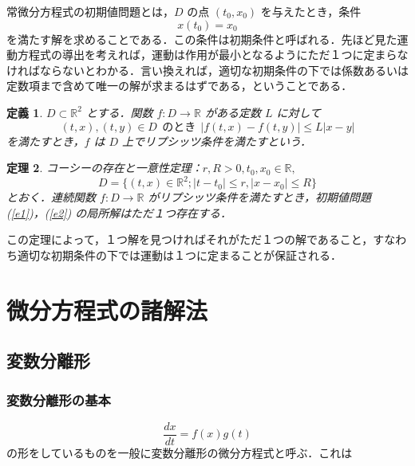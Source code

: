 \documentclass[dvipdfmx, a4paper]{jsarticle}
\newcommand{\R}{\mathbb{R}}
\newtheorem{theorem}{定理}
\newtheorem{definition}[theorem]{定義}
\begin{document}
常微分方程式の初期値問題とは，$D$ の点 $(t_0, x_0)$ を与えたとき，条件
\begin{equation}
    \label{e2}
    x(t_0)=x_0
\end{equation}
を満たす解を求めることである．この条件は初期条件と呼ばれる．先ほど見た運動方程式の導出を考えれば，運動は作用が最小となるようにただ１つに定まらなければならないとわかる．言い換えれば，適切な初期条件の下では係数あるいは定数項まで含めて唯一の解が求まるはずである，ということである．

\begin{definition}
    $D\subset\R^2$ とする．関数 $f: D\to\R$ がある定数 $L$ に対して
    \begin{equation}
        (t, x), (t, y)\in D\ \  のとき\ \ |f(t, x)-f(t, y)|\leq L|x-y|
    \end{equation}
    を満たすとき，$f$ は $D$ 上でリプシッツ条件を満たすという．
\end{definition}

\begin{theorem}
    コーシーの存在と一意性定理：$r, R>0, t_0, x_0\in\R,$
    \begin{equation}
        D=\{(t, x)\in\R^2; |t-t_0|\leq r, |x-x_0|\leq R\}
    \end{equation}
    とおく．連続関数 $f:D\to\R$ がリプシッツ条件を満たすとき，初期値問題 (\ref{e1})，(\ref{e2}) の局所解はただ１つ存在する．
\end{theorem}

この定理によって，１つ解を見つければそれがただ１つの解であること，すなわち適切な初期条件の下では運動は１つに定まることが保証される．

\section{微分方程式の諸解法}

\subsection{変数分離形}

\subsubsection{変数分離形の基本}

\begin{equation}
    \frac{dx}{dt}=f(x)g(t)
\end{equation}
の形をしているものを一般に変数分離形の微分方程式と呼ぶ．これは
\end{document}
